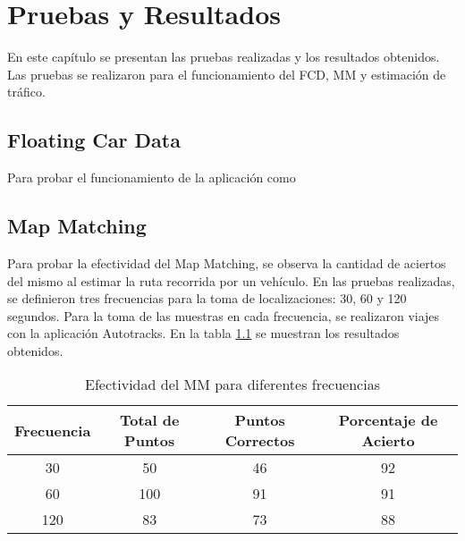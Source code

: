 \chapter{Pruebas y Resultados}

En este capítulo se presentan las pruebas realizadas y los resultados obtenidos. Las pruebas se realizaron para el funcionamiento del FCD, MM y estimación de tráfico.

\section{Floating Car Data}

Para probar el funcionamiento de la aplicación como 

\section{Map Matching}

Para probar la efectividad del Map Matching, se observa la cantidad de aciertos del mismo al estimar la ruta recorrida por un vehículo. En las pruebas realizadas, se definieron  tres frecuencias para la toma de localizaciones: 30, 60 y 120 segundos. Para la toma de las muestras en cada frecuencia, se realizaron viajes con la aplicación Autotracks. En la tabla \ref{table:map_matching} se muestran los resultados obtenidos.

\begin{table}[ht]
	\caption{Efectividad del MM para diferentes frecuencias} 
	\centering
	\begin{tabular}{c c c c}
		\hline\hline
		Frecuencia & Total de Puntos & Puntos Correctos & Porcentaje de Acierto\\ [0.5ex]
		\hline
		30 & 50 & 46 & 92 \\
		60 & 100 & 91 & 91 \\
		120 & 83 & 73 & 88\\ [1ex]
		\hline
	\end{tabular}
	\label{table:map_matching}
\end{table}

